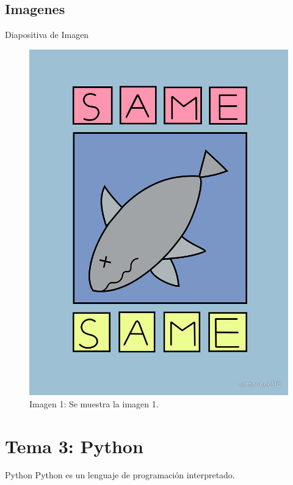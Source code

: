 \documentclass[12pt]{beamer}
\begin{document}
\subsection{Imagenes}

\begin{frame}{Diapositiva de Imagen}
\begin{figure}[t]
\includegraphics[scale=0.15]{shark.jpg} 
\caption{Imagen 1: Se muestra la imagen 1.}
\end{figure}
\end{frame}


\section{Tema 3: Python}

\begin{frame}{Python}
Python es un lenguaje de programación interpretado.
\end{frame}
\end{document}
